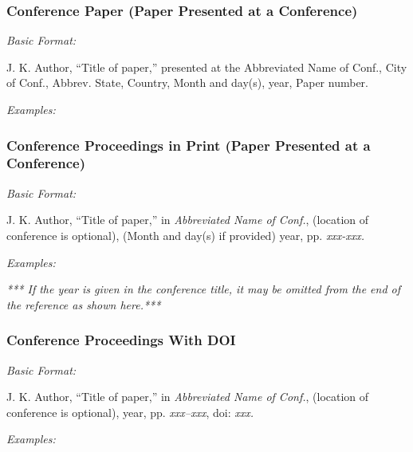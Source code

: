 \documentclass[10pt]{article}
\newcommand*{\guidelabel}[1]{\par\vspace{-4pt}\hspace*{22pt}\textit{#1}\par\vspace{-\parskip}}
\begin{document}
\subsubsection{Conference Paper (Paper Presented at a Conference)}
\guidelabel{Basic Format:}
\begin{guideitems}
  \item J. K. Author, “Title of paper,” presented at the Abbreviated Name of Conf., City of Conf., Abbrev. State, Country, Month and day(s), year, Paper number.
\end{guideitems}
\guidelabel{Examples:}
\begin{guideitems}
  \item {}
  \item {}
  \item {}
  \item {}
\end{guideitems}

\subsubsection{Conference Proceedings in Print (Paper Presented at a Conference)}
\guidelabel{Basic Format:}
\begin{guideitems}
  \item J. K. Author, “Title of paper,” in \textit{Abbreviated Name of Conf.}, (location of conference is optional), (Month and day(s) if provided) year, pp. \textit{xxx-xxx.}
\end{guideitems}
\guidelabel{Examples:}
\begin{guideitems}
  \item {}
  \item {} \textit{*** If the year is given in the conference title, it may be omitted from the end of the reference as shown here.***}
  \item {}
  \item {}
  \item {}
  \item {}
  \item {}
\end{guideitems}

\subsubsection{Conference Proceedings With DOI}
\guidelabel{Basic Format:}
\begin{guideitems}
  \item J. K. Author, “Title of paper,” in \textit{Abbreviated Name of Conf.}, (location of conference is optional), year, pp. \textit{xxx–xxx}, doi: \textit{xxx.}
\end{guideitems}
\guidelabel{Examples:}
\begin{guideitems}
  \item {}
  \item {}
\end{guideitems}
\end{document}
